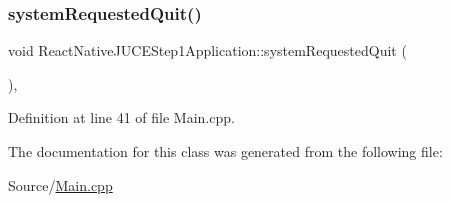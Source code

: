 \subsubsection{\texorpdfstring{system\+Requested\+Quit()}{systemRequestedQuit()}}
{\footnotesize\ttfamily void React\+Native\+J\+U\+C\+E\+Step1\+Application\+::system\+Requested\+Quit (\begin{DoxyParamCaption}{ }\end{DoxyParamCaption})\hspace{0.3cm}{\ttfamily [inline]}, {\ttfamily [override]}}



Definition at line 41 of file Main.\+cpp.



The documentation for this class was generated from the following file\+:\begin{DoxyCompactItemize}
\item 
Source/\mbox{\hyperlink{_main_8cpp}{Main.\+cpp}}\end{DoxyCompactItemize}
